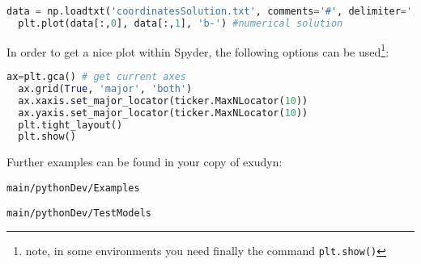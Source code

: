 \begin{lstlisting}[language=Python, firstnumber=70]
  data = np.loadtxt('coordinatesSolution.txt', comments='#', delimiter=',')
  plt.plot(data[:,0], data[:,1], 'b-') #numerical solution
\end{lstlisting}
%
In order to get a nice plot within Spyder, the following options can be used\footnote{note, in some environments you need finally the command \texttt{plt.show()}}:
\begin{lstlisting}[language=Python, firstnumber=72]
  ax=plt.gca() # get current axes
  ax.grid(True, 'major', 'both')
  ax.xaxis.set_major_locator(ticker.MaxNLocator(10))
  ax.yaxis.set_major_locator(ticker.MaxNLocator(10))
  plt.tight_layout()
  plt.show() 
\end{lstlisting}
%
%
\vspace{24pt}
Further examples can be found in your copy of exudyn: 
\bi
  \item[] \texttt{main/pythonDev/Examples}
  \item[] \texttt{main/pythonDev/TestModels}
\ei



